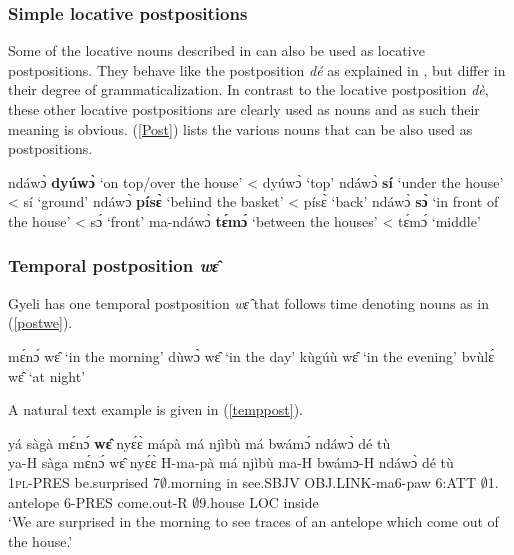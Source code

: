\subsubsection{Simple locative postpositions}
\label{sec:LOCgen}

Some of the locative nouns described in  can also be used as locative postpositions. They behave like the postposition {\itshape dé} as explained in  , but differ in their degree of grammaticalization.  In contrast to the locative postposition {\itshape dè}, these other locative postpositions are clearly used as nouns and as such their meaning is obvious. (\ref{Post}) lists the various nouns that can be also used as postpositions.

\begin{exe}
\ex\label{Post}
\begin{xlist}
\ex ndáwɔ̀ {\bfseries dyúwɔ̀} `on top/over the house' <  dyúwɔ̀ `top'
\ex ndáwɔ̀ {\bfseries sí} `under the house' <  sí `ground'
\ex ndáwɔ̀ {\bfseries písɛ̀} `behind the basket' <  písɛ̀ `back'
\ex ndáwɔ̀ {\bfseries sɔ̀} `in front of the house' <  sɔ́ `front' 
\ex ma-ndáwɔ̀ {\bfseries tɛ́mɔ́} `between the houses' < tɛ́mɔ́ `middle'
\end{xlist}
\end {exe}





\subsubsection{Temporal postposition {\itshape wɛ̂ }}
\label{sec:POSTwe}

Gyeli has one temporal postposition {\itshape wɛ̂} that follows time denoting nouns as in (\ref{postwe}).

\begin{exe}
\ex\label{postwe}
\begin{xlist}
\ex mɛ́nɔ́ wɛ̂  `in the morning'
\ex dùwɔ̀ wɛ̂  `in the day'
\ex kùgúù wɛ̂  `in the evening'
\ex bvùlɛ́ wɛ̂  `at night'
\end{xlist}
\end{exe}


\noindent A natural text example is given in (\ref{temppost}). 

\begin{exe} 
\ex\label{temppost} 
  \glll   yá sàgà mɛ́nɔ́ {\bfseries wɛ̂} nyɛ́ɛ̀ mápà má njìbù má bwámɔ́ ndáwɔ̀ dé tù \\
          ya-H sàga mɛ́nɔ́ wɛ̂ nyɛ́ɛ̀ H-ma-pà má njìbù ma-H bwámɔ-H ndáwɔ̀ dé tù     \\
        1\textsc{pl}-PRES be.surprised 7$\emptyset$.morning in see.SBJV OBJ.LINK-ma6-paw 6:ATT $\emptyset$1. antelope 6-PRES come.out-R $\emptyset$9.house LOC inside  \\
    \trans `We are surprised in the morning to see traces of an antelope which come out of the house.'
\end{exe}






